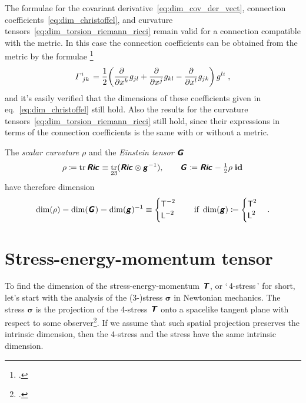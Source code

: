 \documentclass[a4paper,12pt,onecolumn,oneside,article,british]{memoir}
\makeatletter
\newcommand*{\defquote}[1]{`\,#1\,'}
\newcommand*{\mathte}[1]{\textbf{\textit{\textsf{#1}}}}
\newcommand*{\citep}{\footcites}
\newcommand*{\de}{\partial}%
\DeclareMathOperator{\tr}{tr}%
\newcommand*{\defd}{\coloneqq}
\newcommand*{\sect}{\S}%
\newcommand*{\eqn}{eq.}%
\newcommand*{\q}{}%
\DeclareRobustCommand*{\q}{%
  \mathbin{\mathpalette\bigcdot@{}}%
}
\newcommand*{\bigcdot@scalefactor}{0.7}
\newcommand*{\bigcdot@widthfactor}{1.5}
\newcommand*{\bigcdot@}[2]{%
  \sbox0{$#1\vcenter{}$}%
  \sbox2{$#1\cdot\m@th$}%
  \hbox to \bigcdot@widthfactor\wd2{%
    \hfil
    \raise\ht0\hbox{%
      \scalebox{\bigcdot@scalefactor}{%
        \lower\ht0\hbox{$#1\bullet\m@th$}%
      }%
    }%
    \hfil
  }%
}
\newcommand*{\Le}{\textsf{L}}
\newcommand*{\Ti}{\textsf{T}}
\newcommand*{\yg}{\mathte{g}}
\newcommand*{\yT}{\mathte{T}}
\newcommand*{\yG}{\mathte{G}}
\newcommand*{\yRi}{\mathte{Ric}}
\newcommand*{\ysc}{\rho}
\renewcommand*{\i}{\indices}
\newcommand*{\dex}[1][i]{\frac{\de}{\de x^{#1}}}
\newcommand*{\yGa}{\varGamma}
\newcommand*{\id}{\mathbf{id}}%
\newcommand*{\yt}{\bm{\sigma}}
\makeatother
\begin{document}
\medskip

The formulae for the covariant derivative~\eqref{eq:dim_cov_der_vect},
connection coefficients~\eqref{eq:dim_christoffel}, and curvature
tensors~\eqref{eq:dim_torsion_riemann_ricci} remain valid for a connection
compatible with the metric. In this case the connection coefficients can be
obtained from the metric by the formulae
\citep[\sect~V.B.2]{choquetbruhatetal1977_r1996}
\begin{equation}
  \label{eq:christoffel_g}
  \yGa\i{^{i}_{jk}} = \frac{1}{2}
  \biggl(\dex[k]g_{jl} + \dex[j]g_{kl} - \dex[l]g_{jk}\biggr)\,g^{li} \;,
\end{equation}
and it's easily verified that the dimensions of these coefficients given in
\eqn~\eqref{eq:dim_christoffel} still hold. Also the results for the
curvature tensors~\eqref{eq:dim_torsion_riemann_ricci} still hold, since
their expressions in terms of the connection coefficients is the same with
or without a metric.

\medskip

The \emph{scalar curvature} $\ysc$ and the \emph{Einstein tensor}
$\yG\i{_{\q}^{\q}}$
\begin{equation}
  \label{eq:curv_einst}
  \ysc \defd \tr\yRi\i{_{\q}^{\q}}\equiv\tr_{23}(\yRi\otimes\yg^{-1}),
  \qquad
  \yG\i{_{\q}^{\q}} \defd \yRi\i{_{\q}^{\q}} -
  \tfrac{1}{2} \ysc\;\id\i{_{\q}^{\q}} 
\end{equation}
have therefore dimension
\begin{equation}
  \label{eq:dim_curv_einst}
  \dim(\ysc) = \dim(\yG\i{_{\q}^{\q}}) =\dim(\yg)^{-1} \equiv
  \begin{cases}
    \Ti^{-2} \\
    \Le^{-2}
  \end{cases}
  \quad\text{if }\dim(\yg)\defd
  \begin{cases}
     \Ti^2 \\
    \Le^2
  \end{cases}.
\end{equation}

\section{Stress-energy-momentum tensor}
\label{sec:stressenergy}

To find the dimension of the stress-energy-momentum $\yT$, or
\defquote{4-stress} for short, let's start with the analysis of the
(3-)stress $\yt$ in Newtonian mechanics. The stress $\yt$ is the projection
of the 4-stress $\yT$ onto a spacelike tangent plane with respect to some
observer\citep[\sect~3.4.1]{gourgoulhon2007_r2012}{smarretal1978,york1979,smarretal1980}[\sect~1.3]{wilsonetal2003_r2007}[the
projection doesn't need to be
orthogonal:][\sect~2.4]{marsdenetal1994}[\sect~B.1.4]{hehletal2003}. If we
assume that such spatial projection preserves the intrinsic dimension, then
the 4-stress and the stress have the same intrinsic dimension.
\end{document}
